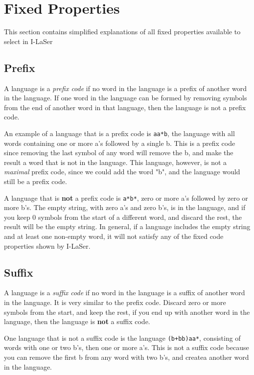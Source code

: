\documentclass{article}
\begin{document}
\section{Fixed Properties}

This section contains simplified explanations of all fixed properties available to select in I-LaSer

\subsection{Prefix}
A language is a \textit{prefix code} if no word in the language is a prefix of another word in the language. If one word in the language can be formed by removing symbols from the end of another word in that language, then the language is not a prefix code.

\par An example of a language that is a prefix code is \verb-aa*b-, the language with all words containing one or more a's followed by a single b. This is a prefix code since removing the last symbol of any word will remove the b, and make the result a word that is not in the language. This language, however, is not a \textit{maximal} prefix code, since we could add the word "b", and the language would still be a prefix code.

\par A language that is \textbf{not} a prefix code is \verb-a*b*-, zero or more a's followed by zero or more b's. The empty string, with zero a's and zero b's, is in the language, and if you keep 0 symbols from the start of a different word, and discard the rest, the result will be the empty string. In general, if a language includes the empty string and at least one non-empty word, it will not satisfy any of the fixed code properties shown by I-LaSer.

\subsection{Suffix}
A language is a \textit{suffix code} if no word in the language is a suffix of another word in the language. It is very similar to the prefix code. Discard zero or more symbols from the start, and keep the rest, if you end up with another word in the language, then the language is \textbf{not} a suffix code.

\par One language that is not a suffix code is the language \verb-(b+bb)aa*-, consisting of words with one or two b's, then one or more a's. This is not a suffix code because you can remove the first b from any word with two b's, and createa another word in the language.
\end{document}
